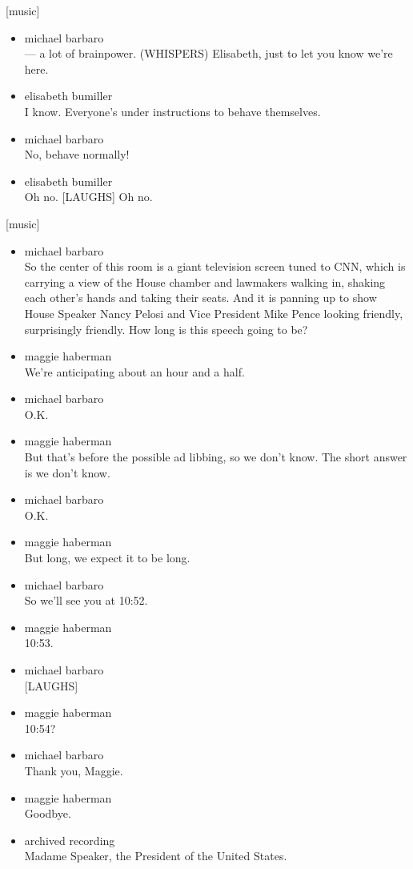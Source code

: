 {[}music{]}

\begin{itemize}
\item
  michael barbaro\\
  --- a lot of brainpower. (WHISPERS) Elisabeth, just to let you know
  we're here.
\item
  elisabeth bumiller\\
  I know. Everyone's under instructions to behave themselves.
\item
  michael barbaro\\
  No, behave normally!
\item
  elisabeth bumiller\\
  Oh no. {[}LAUGHS{]} Oh no.
\end{itemize}

{[}music{]}

\begin{itemize}
\item
  michael barbaro\\
  So the center of this room is a giant television screen tuned to CNN,
  which is carrying a view of the House chamber and lawmakers walking
  in, shaking each other's hands and taking their seats. And it is
  panning up to show House Speaker Nancy Pelosi and Vice President Mike
  Pence looking friendly, surprisingly friendly. How long is this speech
  going to be?
\item
  maggie haberman\\
  We're anticipating about an hour and a half.
\item
  michael barbaro\\
  O.K.
\item
  maggie haberman\\
  But that's before the possible ad libbing, so we don't know. The short
  answer is we don't know.
\item
  michael barbaro\\
  O.K.
\item
  maggie haberman\\
  But long, we expect it to be long.
\item
  michael barbaro\\
  So we'll see you at 10:52.
\item
  maggie haberman\\
  10:53.
\item
  michael barbaro\\
  {[}LAUGHS{]}
\item
  maggie haberman\\
  10:54?
\item
  michael barbaro\\
  Thank you, Maggie.
\item
  maggie haberman\\
  Goodbye.
\item
  archived recording\\
  Madame Speaker, the President of the United States.
\end{itemize}

